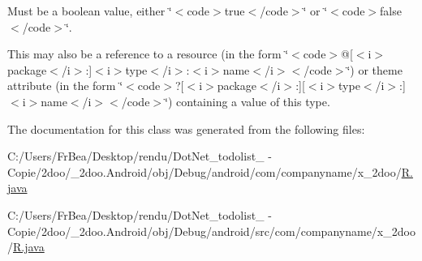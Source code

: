 Must be a boolean value, either \char`\"{}$<$code$>$true$<$/code$>$\char`\"{} or \char`\"{}$<$code$>$false$<$/code$>$\char`\"{}. 

This may also be a reference to a resource (in the form \char`\"{}$<$code$>$@\mbox{[}$<$i$>$package$<$/i$>$:\mbox{]}$<$i$>$type$<$/i$>$:$<$i$>$name$<$/i$>$$<$/code$>$\char`\"{}) or theme attribute (in the form \char`\"{}$<$code$>$?\mbox{[}$<$i$>$package$<$/i$>$:\mbox{]}\mbox{[}$<$i$>$type$<$/i$>$:\mbox{]}$<$i$>$name$<$/i$>$$<$/code$>$\char`\"{}) containing a value of this type. 

The documentation for this class was generated from the following files:\begin{CompactItemize}
\item 
C:/Users/FrBea/Desktop/rendu/DotNet\_\-todolist\_ - Copie/2doo/\_\-2doo.Android/obj/Debug/android/com/companyname/x\_\-2doo/\hyperlink{com_2companyname_2x__2doo_2_r_8java}{R.java}\item 
C:/Users/FrBea/Desktop/rendu/DotNet\_\-todolist\_ - Copie/2doo/\_\-2doo.Android/obj/Debug/android/src/com/companyname/x\_\-2doo/\hyperlink{src_2com_2companyname_2x__2doo_2_r_8java}{R.java}\end{CompactItemize}
